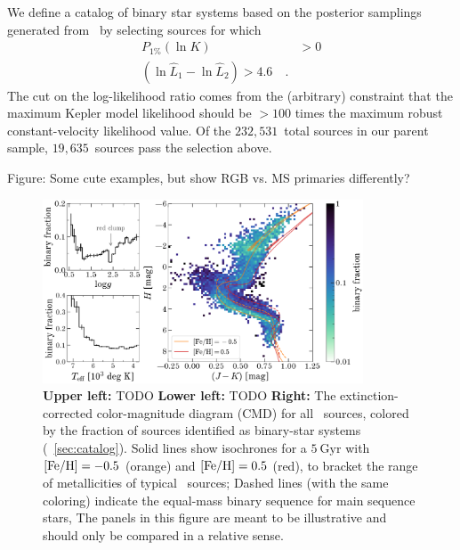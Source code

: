 \documentclass[modern]{aastex63}
\newcommand{\nsources}{\ensuremath{232,531}}
\newcommand{\nbinary}{\ensuremath{19,635}}
\begin{document}
We define a catalog of binary star systems based on the posterior samplings
generated from \thejoker\ by selecting sources for which
\begin{align}
    P_{1\%}(\ln K) &> 0\\
    (\ln \hat{L}_1 - \ln \hat{L}_2) > 4.6 \quad . \label{eq:binary-cuts}
\end{align}
The cut on the log-likelihood ratio comes from the (arbitrary) constraint that
the maximum Kepler model likelihood should be $>100$ times the maximum robust
constant-velocity likelihood value.
Of the \nsources\ total sources in our parent sample, \nbinary\ sources pass the
selection above.


Figure: Some cute examples, but show RGB vs. MS primaries differently?

\begin{figure}[!t]
    \begin{center}
    \includegraphics[width=0.85\textwidth]{binary-fraction.pdf}
    \end{center}
    \caption{%
    \textbf{Upper left:} TODO
    \textbf{Lower left:} TODO
    \textbf{Right:} The extinction-corrected  color-magnitude
    diagram (CMD) for all \apogee\ sources, colored by the fraction of sources
    identified as binary-star systems (\sectionname~\ref{sec:catalog}).
    Solid lines show  isochrones for a $5~\mathrm{Gyr}$ with
    ${[{\rm Fe}/{\rm H}]} = -0.5$ (orange) and ${[{\rm Fe}/{\rm H}]} = 0.5$ (red), to bracket the range of
    metallicities of typical \apogee\ sources; Dashed lines (with the same
    coloring) indicate the equal-mass binary sequence for main sequence stars,
    The panels in this figure are meant to be illustrative and should only be
    compared in a relative sense.
    \label{fig:binary-CMD}
    }
\end{figure}
\end{document}
